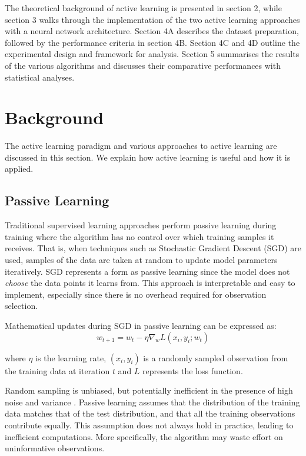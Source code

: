 \documentclass[10pt, conference]{IEEEtran}
\begin{document}
The theoretical background of active learning is presented in section 2, while section 3 walks through the implementation of the two active learning approaches with a neural network architecture. Section 4A describes the dataset preparation, followed by the performance criteria in section 4B. Section 4C and 4D outline the experimental design and framework for analysis. Section 5 summarises the results of the various algorithms and discusses their comparative performances with statistical analyses.

\section{Background}
The active learning paradigm and various approaches to active learning are discussed in this section. We explain how active learning is useful and how it is applied.

\subsection{Passive Learning}
Traditional supervised learning approaches perform passive learning during training where the algorithm has no control over which training samples it receives. That is, when techniques such as Stochastic Gradient Descent (SGD) are used, samples of the data are taken at random to update model parameters iteratively. SGD represents a form as passive learning since the model does not \textit{choose} the data points it learns from. This approach is interpretable and easy to implement, especially since there is no overhead required for observation selection.

Mathematical updates during SGD in passive learning can be expressed as:
\[
w_{t+1} = w_t - \eta \nabla_{w} L(x_i, y_i; w_t)
\]

where $\eta$ is the learning rate, $(x_i, y_i)$ is a randomly sampled observation 
from the training data at iteration $t$ and $L$ represents the loss function.



Random sampling is unbiased, but potentially inefficient in the presence of high noise and variance \cite{mahdavi}. Passive learning assumes that the distribution of the training data matches that of the test distribution, and that all the training observations contribute equally. This assumption does not always hold in practice, leading to inefficient computations. More specifically, the algorithm may waste effort on uninformative observations.
\end{document}
